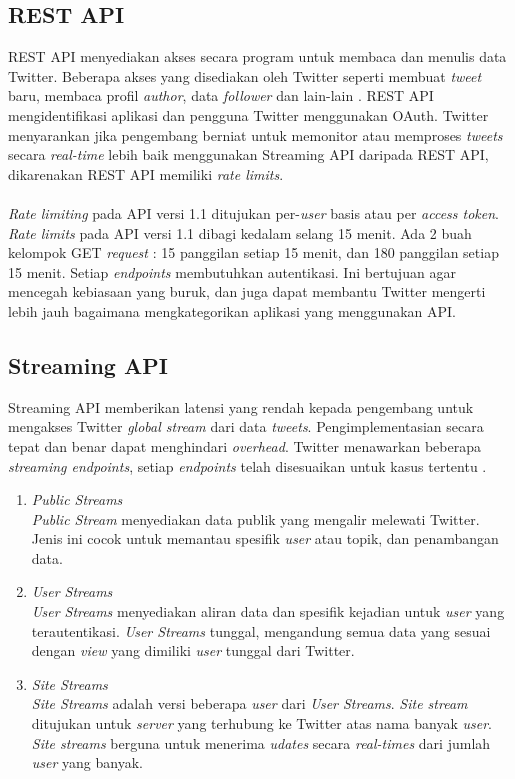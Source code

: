\subsection{REST API}
REST API menyediakan akses secara program untuk membaca dan menulis data Twitter. Beberapa akses yang disediakan oleh Twitter seperti membuat \textit{tweet} baru, membaca profil \textit{author}, data \textit{follower} dan lain-lain \cite{RESTAPI:2015}. REST API mengidentifikasi aplikasi dan pengguna Twitter menggunakan OAuth. Twitter menyarankan jika pengembang berniat untuk memonitor atau memproses \textit{tweets} secara \textit{real-time} lebih baik menggunakan Streaming API daripada REST API, dikarenakan REST API memiliki \textit{rate limits}.\\\\
\textit{Rate limiting} pada API versi 1.1 ditujukan per-\textit{user} basis atau per \textit{access token}. \textit{Rate limits} pada API versi 1.1 dibagi kedalam selang 15 menit. Ada 2 buah kelompok GET \textit{request} : 15 panggilan setiap 15 menit, dan 180 panggilan setiap 15 menit. Setiap \textit{endpoints} membutuhkan autentikasi. Ini bertujuan agar mencegah kebiasaan yang buruk, dan juga dapat membantu Twitter mengerti lebih jauh bagaimana mengkategorikan aplikasi yang menggunakan API.
\subsection{Streaming API}
Streaming API memberikan latensi yang rendah kepada pengembang untuk mengakses Twitter \textit{global stream} dari data \textit{tweets}. Pengimplementasian secara tepat dan benar dapat menghindari \textit{overhead}. Twitter menawarkan beberapa \textit{streaming endpoints}, setiap \textit{endpoints} telah disesuaikan untuk kasus tertentu \cite{StreamingAPI:2015}.
\begin{enumerate}
	\item \textit{Public Streams}\\
	\textit{Public Stream} menyediakan data publik yang mengalir melewati Twitter. Jenis ini cocok untuk memantau spesifik \textit{user} atau topik, dan penambangan data.
	\item \textit{User Streams}\\
	\textit{User Streams} menyediakan aliran data dan spesifik kejadian untuk \textit{user} yang terautentikasi. \textit{User Streams} tunggal, mengandung semua data yang sesuai dengan \textit{view} yang dimiliki \textit{user} tunggal dari Twitter. 
	\item \textit{Site Streams}\\
	\textit{Site Streams} adalah versi beberapa \textit{user} dari \textit{User Streams}. \textit{Site stream} ditujukan untuk \textit{server}  yang terhubung ke Twitter atas nama banyak \textit{user}. \textit{Site streams} berguna untuk menerima \textit{udates} secara \textit{real-times} dari jumlah \textit{user} yang banyak. 
\end{enumerate}
